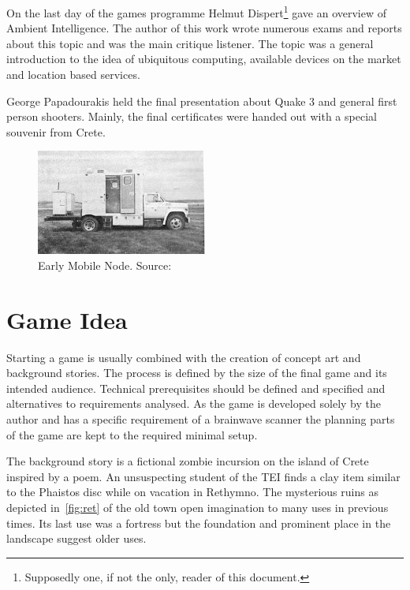 \documentclass[bibtotocnumbered, headsepline,normalheadings,12pt]{report}
\begin{document}
On the last day of the games programme Helmut Dispert\footnote{Supposedly one, if not the only, reader of this document.} gave an overview of 
Ambient Intelligence. The author of this work wrote numerous exams and reports about this topic and was the main  critique listener.  
The topic was a general introduction to the idea of ubiquitous computing, available devices on the market and location based services.

George Papadourakis held the final presentation about Quake 3 and general first person shooters. Mainly, the final certificates were handed out 
with a special souvenir from Crete.

\begin{figure}[H]
    \centering
    \includegraphics[width=0.5\textwidth]{earlynode.png}%
    \caption{Early Mobile Node. Source:~\cite{Chong}}
    \label{fig:node}%
\end{figure}


\chapter{Game Idea}
\label{chap:idea}

Starting a game is usually combined with the creation of concept art and background stories. The process is defined by the size of 
the final game and its intended audience. Technical prerequisites should be defined and specified and alternatives to requirements 
analysed.
As the game is developed solely by the author and has a specific requirement of a brainwave scanner the planning parts of the 
game are kept to the required minimal setup.

The background story is a fictional zombie incursion on the island of Crete inspired by a poem. An unsuspecting student of the TEI finds a clay item
similar to the Phaistos disc while on vacation in Rethymno. The mysterious ruins as depicted in~\ref{fig:ret} of the old town open imagination to many uses
in previous times. Its last use was a fortress but the foundation and prominent place in the landscape suggest older uses.
\end{document}
